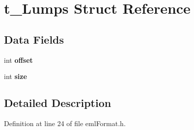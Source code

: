 \hypertarget{structt___lumps}{}\section{t\+\_\+\+Lumps Struct Reference}
\label{structt___lumps}
\subsection*{Data Fields}
\begin{DoxyCompactItemize}
\item 
int {\bfseries offset}\hypertarget{structt___lumps_abbea501f895dc7ab564a6709168d7b5f}{}\label{structt___lumps_abbea501f895dc7ab564a6709168d7b5f}

\item 
int {\bfseries size}\hypertarget{structt___lumps_a59f23cda411aa5829f7ff757c568e526}{}\label{structt___lumps_a59f23cda411aa5829f7ff757c568e526}

\end{DoxyCompactItemize}


\subsection{Detailed Description}


Definition at line 24 of file eml\+Format.\+h.

